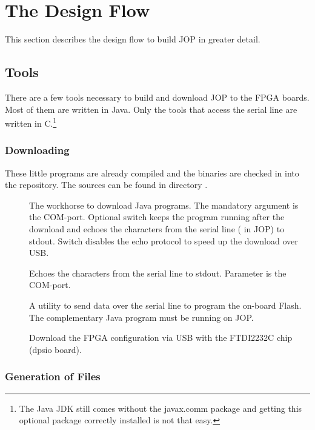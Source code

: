 \section{The Design Flow}

This section describes the design flow to build JOP in greater
detail.

\subsection{Tools}

There are a few tools necessary to build and download JOP to the FPGA
boards. Most of them are written in Java. Only the tools that access
the serial line are written in C.\footnote{The Java JDK still comes
without the javax.comm package and getting this optional package
correctly installed is not that easy.}

\subsubsection{Downloading}

These little programs are already compiled and the binaries are
checked in into the repository. The sources can be found in directory
.

\begin{description}
    \item[] The workhorse to download Java programs. The
    mandatory argument is the COM-port. Optional switch 
    keeps the program running after the download and echoes the
    characters from the serial line ( in JOP) to
    stdout. Switch  disables the echo protocol to speed up the
    download over USB.
    \item[] Echoes the characters from the serial line
        to stdout. Parameter is the COM-port.
    \item[] A utility to send data over the serial
        line to program the on-board Flash. The complementary
        Java program  must be running on JOP.
    \item[] Download the FPGA configuration via
    USB with the FTDI2232C chip (dpsio board).
\end{description}

\subsubsection{Generation of Files}

